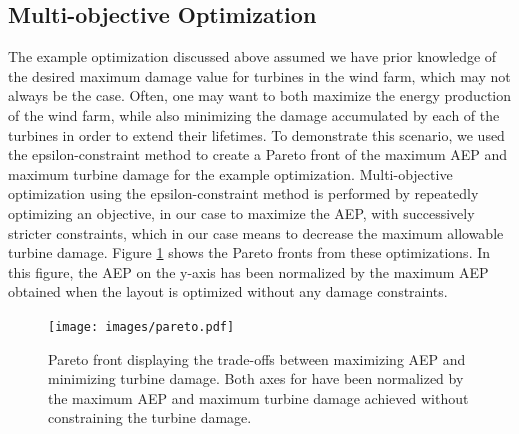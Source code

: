 \documentclass[11pt,letterpaper]{article}
\begin{document}



\subsection{Multi-objective Optimization}

The example optimization discussed above assumed we have prior knowledge of the desired maximum damage value for turbines in the wind farm, which may not always be the case. Often, one may want to both maximize the energy production of the wind farm, while also minimizing the damage accumulated by each of the turbines in order to extend their lifetimes. To demonstrate this scenario, we used the epsilon-constraint method to create a Pareto front of the maximum AEP and maximum turbine damage for the example optimization. Multi-objective optimization using the epsilon-constraint method is performed by repeatedly optimizing an objective, in our case to maximize the AEP, with successively stricter constraints, which in our case means to decrease the maximum allowable turbine damage. Figure \ref{pareto} shows the Pareto fronts from these optimizations. In this figure, the AEP on the y-axis has been normalized by the maximum AEP obtained when the layout is optimized without any damage constraints. 
% 
\begin{figure}
    \centering
    \texttt{[image: images/pareto.pdf]}
    \caption{Pareto front displaying the trade-offs  between maximizing AEP and minimizing turbine damage. Both axes for have been normalized by the maximum AEP and maximum turbine damage achieved without constraining the turbine damage.}
    \label{pareto}
\end{figure}
\end{document}

